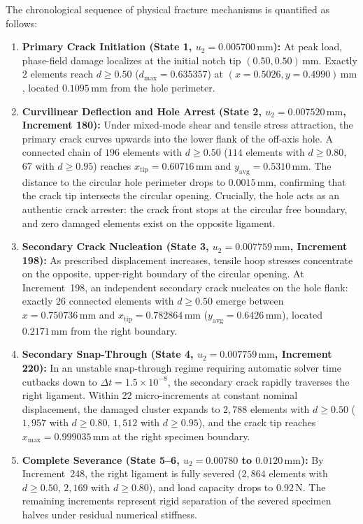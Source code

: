 The chronological sequence of physical fracture mechanisms is quantified as follows:
\begin{enumerate}
  \item \textbf{Primary Crack Initiation (State 1, $u_2 = 0.005700\,\mathrm{mm}$):} At peak load, phase-field damage localizes at the initial notch tip $(0.50, 0.50)\,\mathrm{mm}$. Exactly $2$ elements reach $d \ge 0.50$ ($d_{\max} = 0.635357$) at $(x=0.5026, y=0.4990)\,\mathrm{mm}$, located $0.1095\,\mathrm{mm}$ from the hole perimeter.
  \item \textbf{Curvilinear Deflection and Hole Arrest (State 2, $u_2 = 0.007520\,\mathrm{mm}$, Increment 180):} Under mixed-mode shear and tensile stress attraction, the primary crack curves upwards into the lower flank of the off-axis hole. A connected chain of $196$ elements with $d \ge 0.50$ ($114$ elements with $d \ge 0.80$, $67$ with $d \ge 0.95$) reaches $x_{\mathrm{tip}} = 0.60716\,\mathrm{mm}$ and $y_{\mathrm{avg}} = 0.5310\,\mathrm{mm}$. The distance to the circular hole perimeter drops to $0.0015\,\mathrm{mm}$, confirming that the crack tip intersects the circular opening. Crucially, the hole acts as an authentic crack arrester: the crack front stops at the circular free boundary, and zero damaged elements exist on the opposite ligament.
  \item \textbf{Secondary Crack Nucleation (State 3, $u_2 = 0.007759\,\mathrm{mm}$, Increment 198):} As prescribed displacement increases, tensile hoop stresses concentrate on the opposite, upper-right boundary of the circular opening. At Increment~198, an independent secondary crack nucleates on the hole flank: exactly $26$ connected elements with $d \ge 0.50$ emerge between $x = 0.750736\,\mathrm{mm}$ and $x_{\mathrm{tip}} = 0.782864\,\mathrm{mm}$ ($y_{\mathrm{avg}} = 0.6426\,\mathrm{mm}$), located $0.2171\,\mathrm{mm}$ from the right boundary.
  \item \textbf{Secondary Snap-Through (State 4, $u_2 = 0.007759\,\mathrm{mm}$, Increment 220):} In an unstable snap-through regime requiring automatic solver time cutbacks down to $\Delta t = 1.5 \times 10^{-8}$, the secondary crack rapidly traverses the right ligament. Within 22 micro-increments at constant nominal displacement, the damaged cluster expands to $2{,}788$ elements with $d \ge 0.50$ ($1{,}957$ with $d \ge 0.80$, $1{,}512$ with $d \ge 0.95$), and the crack tip reaches $x_{\max} = 0.999035\,\mathrm{mm}$ at the right specimen boundary.
  \item \textbf{Complete Severance (State 5--6, $u_2 = 0.00780$ to $0.0120\,\mathrm{mm}$):} By Increment~248, the right ligament is fully severed ($2{,}864$ elements with $d \ge 0.50$, $2{,}169$ with $d \ge 0.80$), and load capacity drops to $0.92\,\mathrm{N}$. The remaining increments represent rigid separation of the severed specimen halves under residual numerical stiffness.
\end{enumerate}

